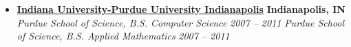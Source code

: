 %
\begin{itemize}
    \parskip=0.1em

    \item
    \headerrow
        {\textbf{\href{https://www.iupui.edu/}{Indiana University-Purdue University Indianapolis}}}
        {\textbf{Indianapolis, IN}}
    \\
    \headerrow
        {\emph{Purdue School of Science, B.S. Computer Science}}
        {\emph{2007 -- 2011}}
    \headerrow
        {\emph{Purdue School of Science, B.S. Applied Mathematics}}
        {\emph{2007 -- 2011}}
\end{itemize}

